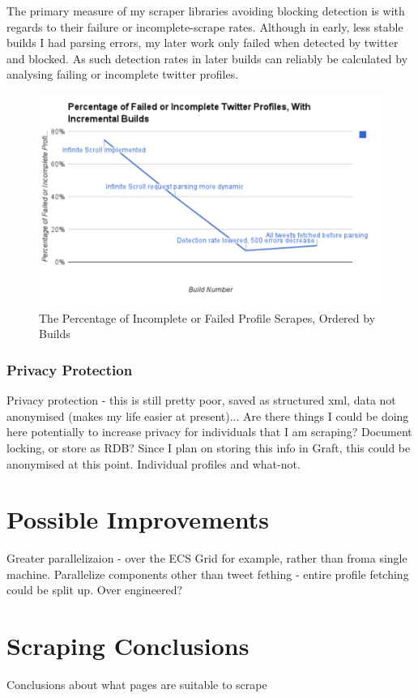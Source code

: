 The primary measure of my scraper libraries avoiding blocking detection is with regards to their failure or incomplete-scrape rates. Although in early, less stable builds I had parsing errors, my later work only failed when detected by twitter and blocked. As such detection rates in later builds can reliably be calculated by analysing failing or incomplete twitter profiles. 

\begin{figure}[h!]
\centering
\includegraphics{Images/percentage_failed_incomplete_twitter_profiles.pdf}
\caption{The Percentage of Incomplete or Failed Profile Scrapes, Ordered by Builds}
\end{figure}

\subsubsection{Privacy Protection}

Privacy protection - this is still pretty poor, saved as structured xml, data not anonymised (makes my life easier at present)... Are there things I could be doing here potentially to increase privacy for individuals that I am scraping? Document locking, or store as RDB? Since I plan on storing this info in Graft, this could be anonymised at this point. Individual profiles and what-not. 

\section{Possible Improvements}

Greater parallelizaion - over the ECS Grid for example, rather than froma  single machine. Parallelize components other than tweet fething - entire profile fetching could be split up. Over engineered? 

\section{Scraping Conclusions}

Conclusions about what pages are suitable to scrape